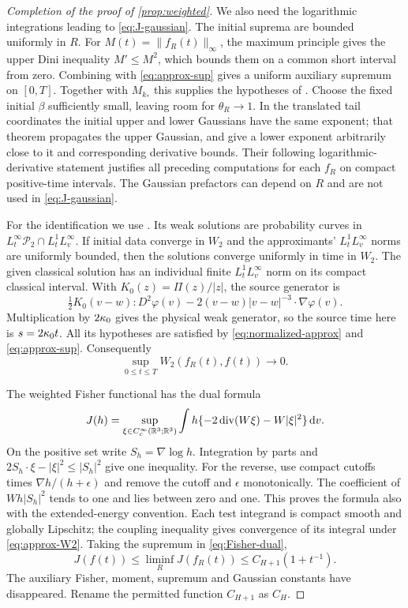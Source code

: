 \begin{proof}[Completion of the proof of \cref{prop:weighted}]
We also need the logarithmic integrations leading to \eqref{eq:J-gaussian}. The initial suprema are bounded uniformly in $R$. For $M(t)=\|f_R(t)\|_\infty$, the maximum principle gives the upper Dini inequality $M'\le M^2$, which bounds them on a common short interval from zero. Combining with \eqref{eq:approx-sup} gives a uniform auxiliary supremum on $[0,T]$. Together with $M_{k_*}$ this supplies the hypotheses of \cite[Theorem~2.3]{GS}. Choose the fixed initial $\beta$ sufficiently small, leaving room for $\theta_R\to1$. In the translated tail coordinates the initial upper and lower Gaussians have the same exponent; that theorem propagates the upper Gaussian, and \cite[Propositions~B.1--B.2]{GS} give a lower exponent arbitrarily close to it and corresponding derivative bounds. Their following logarithmic-derivative statement justifies all preceding computations for each $f_R$ on compact positive-time intervals. The Gaussian prefactors can depend on $R$ and are not used in \eqref{eq:J-gaussian}.

For the identification we use \cite[Theorem~2(ii)]{Fournier}. Its weak solutions are probability curves in $L^\infty_t\mathcal P_2\cap L^1_tL^\infty_v$. If initial data converge in $W_2$ and the approximants' $L^1_tL^\infty_v$ norms are uniformly bounded, then the solutions converge uniformly in time in $W_2$. The given classical solution has an individual finite $L^1_tL^\infty_v$ norm on its compact classical interval. With $K_0(z)=\Pi(z)/|z|$, the source generator is
\[
 \tfrac12 K_0(v-w):D^2\varphi(v)-2(v-w)|v-w|^{-3}\cdot\nabla\varphi(v).
\]
Multiplication by $2\kappa_0$ gives the physical weak generator, so the source time here is $s=2\kappa_0 t$. All its hypotheses are satisfied by \eqref{eq:normalized-approx} and \eqref{eq:approx-sup}. Consequently
\begin{equation}\label{eq:approx-W2}
 \sup_{0\le t\le T}W_2(f_R(t),f(t))\longrightarrow0.
\end{equation}

The weighted Fisher functional has the dual formula
\begin{equation}\label{eq:Fisher-dual}
 J(h)=\sup_{\xi\in C_c^\infty(\mathbb R^3;\mathbb R^3)}
 \int h\{-2\operatorname{div}(W\xi)-W|\xi|^2\}\,\mathrm dv.
\end{equation}
On the positive set write $S_h=\nabla\log h$. Integration by parts and $2S_h\cdot\xi-|\xi|^2\le|S_h|^2$ give one inequality. For the reverse, use compact cutoffs times $\nabla h/(h+\epsilon)$ and remove the cutoff and $\epsilon$ monotonically. The coefficient of $W h|S_h|^2$ tends to one and lies between zero and one. This proves the formula also with the extended-energy convention.
Each test integrand is compact smooth and globally Lipschitz; the coupling inequality gives convergence of its integral under \eqref{eq:approx-W2}. Taking the supremum in \eqref{eq:Fisher-dual},
\[
 J(f(t))\le\liminf_R J(f_R(t))\le C_{H+1}(1+t^{-1}).
\]
The auxiliary Fisher, moment, supremum and Gaussian constants have disappeared. Rename the permitted function $C_{H+1}$ as $C_H$.


\end{proof}

